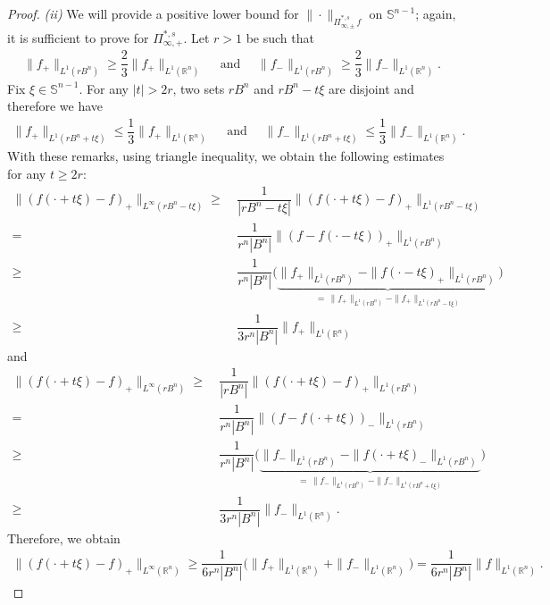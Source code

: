 \documentclass[11pt, reqno]{article}
\theoremstyle{definition}
\numberwithin{equation}{section}
\newcommand{\R}{\mathbb{R}}
\newcommand{\Sphere}{\mathbb{S}^{n - 1}}
\begin{document}
\begin{proof}
\textit{(ii)}
We will provide a positive lower bound for $\| \cdot \|_{\Pi^{\ast, s}_{\infty, \pm} \, f}$ on $\Sphere$; again, it is sufficient to prove for $\Pi^{\ast, s}_{\infty, +}$.
Let $r > 1$ be such that
	\begin{align*}
		\| f_+ \|_{L^1(rB^n)} \geq \dfrac{2}{3} \| f_+ \|_{L^1(\R^n)} \quad \text{ and } \quad \| f_- \|_{L^1(rB^n)} \geq \dfrac{2}{3} \| f_- \|_{L^1(\R^n)}.
	\end{align*}
Fix $\xi \in \Sphere$.
For any $|t| > 2r$, two sets $rB^n$ and $rB^n - t\xi$ are disjoint and therefore we have
	\begin{align*}
		\| f_+ \|_{L^1(rB^n + t\xi)} \leq \dfrac{1}{3} \| f_+ \|_{L^1(\R^n)} \quad \text{ and } \quad \| f_- \|_{L^1(rB^n + t\xi)} \leq \dfrac{1}{3} \| f_- \|_{L^1(\R^n)}.
	\end{align*}
With these remarks, using triangle inequality, we obtain the following estimates for any $t \geq 2r$:
    \begin{align*}
    	\| (f(\cdot + t\xi) -  f)_+ \|_{L^\infty(rB^n - t\xi)} \geq & ~
	\dfrac{1}{|rB^n - t\xi|} \| (f(\cdot + t\xi)  - f)_+ \|_{L^1(rB^n - t\xi)}  \\
	= & ~ 
	\dfrac{1}{r^n |B^n|} \| (f - f(\cdot  - t\xi))_+ \|_{L^1(rB^n)} 
	\\
	\geq & ~ 	
	\dfrac{1}{r^n |B^n|} \Big( 
	\underbrace{  \| f_+ \|_{L^1(rB^n)} -  \| f(\cdot  - t\xi)_+ \|_{L^1(rB^n)} }_{
	\, = \, \| f_+ \|_{L^1(rB^n)} -  \| f_+ \|_{L^1(rB^n - t\xi)} 
	}
    \Big)
	\\
	\geq & ~ 
	\dfrac{1}{3 r^n |B^n|} \| f_+ \|_{L^1(\R^n)}
    \end{align*}
    and
    \begin{align*}
    	\| (f(\cdot + t\xi) -  f)_+ \|_{L^\infty(rB^n)} \geq & ~
	\dfrac{1}{|rB^n|} \| (f(\cdot + t\xi)  - f)_+ \|_{L^1(rB^n)}  \\
	= & ~ 
	\dfrac{1}{r^n |B^n|} \| (f - f(\cdot  + t\xi))_- \|_{L^1(rB^n)} 
	\\
	\geq & ~ 	
	\dfrac{1}{r^n |B^n|} 
	\Big( \underbrace{  \| f_- \|_{L^1(rB^n)} -  \| f(\cdot  + t\xi)_- \|_{L^1(rB^n)} }_{
	\, = \, \| f_- \|_{L^1(rB^n)} -  \| f_- \|_{L^1(rB^n + t\xi)} 
	}
    \Big)
	\\
	\geq & ~ 
	\dfrac{1}{3 r^n |B^n|} \| f_- \|_{L^1(\R^n)}.
    \end{align*}
Therefore, we obtain
	\begin{align*}
		\| (f(\cdot + t\xi) - f)_+ \|_{L^\infty(\R^n)} \geq \dfrac{1}{6 r^n |B^n|} \big( \| f_+ \|_{L^1(\R^n)} + \| f_- \|_{L^1(\R^n)} \big) = \dfrac{1}{6 r^n |B^n|} \| f \|_{L^1(\R^n)}. 

\end{align*}
\end{proof}
\end{document}
